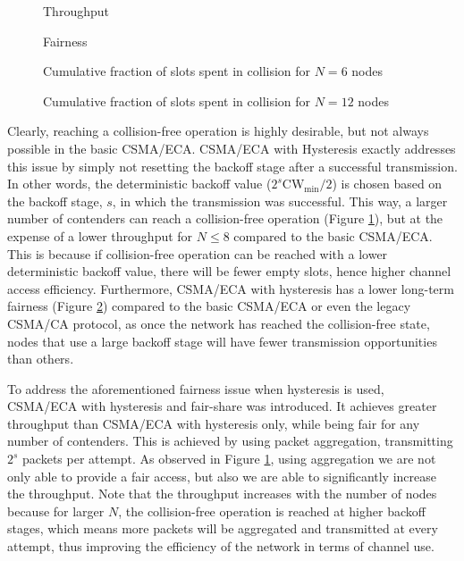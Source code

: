 \documentclass[conference]{IEEEtran}
\begin{document}
\begin{figure}[ht!!!!!!!!]
\centering
{}
\caption{Throughput}\label{Fig:throughput}
\end{figure}

\begin{figure}[ht!!!!!!!!]
\centering
{}
\caption{Fairness}\label{Fig:fairness}
\end{figure}


\begin{figure}[ht!!!!!!!!]
\centering
{}
\caption{Cumulative fraction of slots spent in collision for $N=6$ nodes}\label{Fig:Pc_6}
\end{figure}


\begin{figure}[ht!!!!!!!!]
\centering
{}
\caption{Cumulative fraction of slots spent in collision for $N=12$ nodes}\label{Fig:Pc_12}
\end{figure}

Clearly, reaching a collision-free operation is highly desirable, but not always possible in the basic CSMA/ECA. CSMA/ECA with Hysteresis exactly addresses this issue by simply not resetting the backoff stage after a successful transmission. In other words, the deterministic backoff value ($2^s \text{CW}_{\min}/2$) is chosen based on the backoff stage, $s$, in which the transmission was successful. This way, a larger number of contenders can reach a collision-free operation (Figure \ref{Fig:throughput}), but at the expense of a lower throughput for $N\leq 8$ compared to the basic CSMA/ECA. This is because if collision-free operation can be reached with a lower deterministic backoff value, there will be fewer empty slots, hence higher channel access efficiency. Furthermore, CSMA/ECA with hysteresis has a lower long-term fairness (Figure \ref{Fig:fairness}) compared to the basic CSMA/ECA or even the legacy CSMA/CA protocol, as once the network has reached the collision-free state, nodes that use a large backoff stage will have fewer transmission opportunities than others.

To address the aforementioned fairness issue when hysteresis is used, CSMA/ECA with hysteresis and fair-share was introduced. It achieves greater throughput than CSMA/ECA with hysteresis only, while being fair for any number of contenders. This is achieved by using packet aggregation, transmitting $2^s$ packets per attempt. As observed in Figure \ref{Fig:throughput}, using aggregation we are not only able to provide a fair access, but also we are able to significantly increase the throughput. {Note that the throughput increases with the number of nodes because for larger $N$, the collision-free operation is reached at higher backoff stages, which means more packets will be aggregated and transmitted at every attempt, thus improving the efficiency of the network in terms of channel use.}
\end{document}
